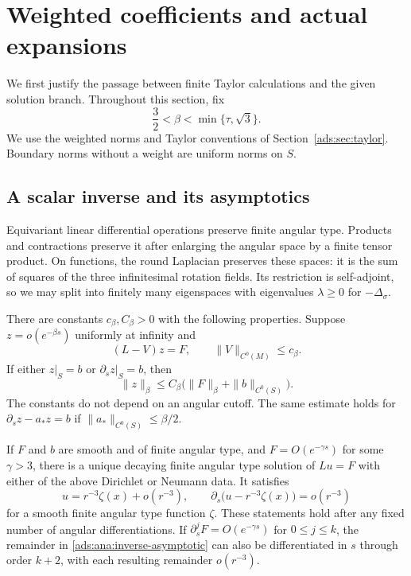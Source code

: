\section{Weighted coefficients and actual expansions}
\label{ads:ana:section}

We first justify the passage between finite Taylor calculations and the
given solution branch.  Throughout this section, fix
\begin{equation}
  \frac32<\beta<\min\{\tau,\sqrt3\}.
  \label{ads:ana:beta}
\end{equation}
We use the weighted norms and Taylor conventions of
Section~\ref{ads:sec:taylor}. Boundary norms without a weight are uniform
norms on $S$.

\subsection{A scalar inverse and its asymptotics}

Equivariant linear differential operations preserve finite angular type.  Products and contractions preserve
it after enlarging the angular space by a finite tensor product.  On
functions, the round Laplacian preserves these spaces: it is the sum of
squares of the three infinitesimal rotation fields.  Its restriction is
self-adjoint, so we may split into finitely many eigenspaces with
eigenvalues $\lambda\geq0$ for $-\Delta_\sigma$.

\begin{lemma}
\label{ads:lem:inverse}
There are constants $c_\beta,C_\beta>0$ with the following properties.
Suppose $z=o(e^{-\beta s})$ uniformly at infinity and
\[
  (L-V)z=F,\qquad \|V\|_{C^0(M)}\leq c_\beta.
\]
If either $z|_S=b$ or $\partial_s z|_S=b$, then
\begin{equation}
  \|z\|_\beta\leq C_\beta
       \bigl(\|F\|_\beta+\|b\|_{C^0(S)}\bigr).
  \label{ads:ana:comparison}
\end{equation}
The constants do not depend on an angular cutoff.  The same estimate
holds for $\partial_s z-a_*z=b$ if
$\|a_*\|_{C^0(S)}\leq\beta/2$.

If $F$ and $b$ are smooth and of finite angular type, and
$F=O(e^{-\gamma s})$ for some $\gamma>3$, there is a unique decaying
finite angular type solution of $Lu=F$ with either of the above
Dirichlet or Neumann data.  It satisfies
\begin{equation}
  u=r^{-3}\zeta(x)+o(r^{-3}),\qquad
  \partial_s\bigl(u-r^{-3}\zeta(x)\bigr)=o(r^{-3})
  \label{ads:ana:inverse-asymptotic}
\end{equation}
for a smooth finite angular type function $\zeta$.  These statements
hold after any fixed number of angular differentiations.  If
$\partial_s^jF=O(e^{-\gamma s})$ for $0\leq j\leq k$, the remainder
in \eqref{ads:ana:inverse-asymptotic} can also be differentiated in $s$
through order $k+2$, with each resulting remainder $o(r^{-3})$.
\end{lemma}

